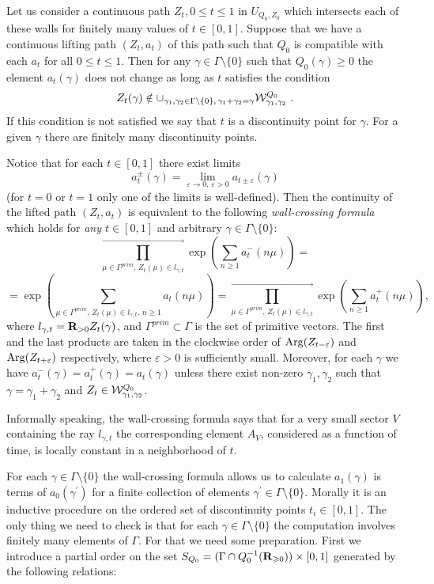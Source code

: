 \documentclass[12pt]{article}
\begin{document}
Let us consider a continuous path $Z_t, 0\le t\le 1$ in $U_{Q_0,Z_0}$ which intersects each of these walls for finitely many values of $t\in [0,1]$. Suppose that we have a continuous lifting path $(Z_t,a_t)$ of this path such that $Q_0$ is compatible with each $a_t$ for all $0\le t\le 1$. Then for any
$\gamma\in \Gamma\setminus \{0\}$ such that $Q_0(\gamma)\geqslant 0$ the element $a_t(\gamma)$ does not change as long as $t$ satisfies the condition $$Z_t(\gamma)\notin \cup_{\gamma_1,\gamma_2\in \Gamma\setminus \{0\},\, \gamma_1+\gamma_2=\gamma}{\cal W}_{\gamma_1,\gamma_2}^{Q_0}\,\,.$$ If this condition is not satisfied we say that $t$ is a discontinuity point for $\gamma$.
For a given $\gamma$ there are finitely many discontinuity points.

Notice that for each $t\in [0,1]$ there exist limits 
$$a^{\pm}_t(\gamma)=\lim_{\varepsilon\to 0, \,\varepsilon>0}a_{t\pm \varepsilon}(\gamma)$$ (for $t=0$ or $t=1$ only one of the limits is well-defined).
Then the continuity of the lifted path $(Z_t,a_t)$ is equivalent to the following {\it wall-crossing formula}
which holds for {\it any $t\in [0,1]$} and arbitrary $\gamma\in \Gamma\setminus\{0\}$:
$$\prod_{\mu\in \Gamma^{prim},\,Z_t(\mu)\in l_{{\gamma},t}}^{\longrightarrow}\exp\left(\sum_{n\geqslant 1}a_t^{-}(n\mu)\right)=$$
$${}=\exp\left(\sum_{\mu\in \Gamma^{prim},\,Z_t(\mu)\in l_{{\gamma},t}, \,n\geqslant 1}a_t(n\mu)\right)=\prod_{\mu\in \Gamma^{prim},\,Z_t(\mu)\in l_{{\gamma},t}}^{\longrightarrow}\exp\left(\sum_{n\geqslant 1}a^{+}_t(n\mu)\right),$$
where $l_{\gamma,t}={\bf R}_{>0}Z_t(\gamma)$, and $\Gamma^{prim}\subset \Gamma$ is the set of primitive vectors.
The first and the last products are taken in the clockwise order of $\operatorname{Arg}(Z_{t-\varepsilon})$ and
$\operatorname{Arg}(Z_{t+\varepsilon})$ respectively, where $\varepsilon>0$ is sufficiently small.
Moreover, for each $\gamma$ we have $a_t^{-}(\gamma)=a_t^{+}(\gamma)=a_t(\gamma)$ unless there exist non-zero $\gamma_1,\gamma_2$ such that $\gamma=\gamma_1+\gamma_2$ and $Z_t\in {\cal W}_{\gamma_1,\gamma_2}^{Q_0}$.

\begin{rmk} Informally speaking, the wall-crossing formula says that for a very small sector $V$ containing the ray $l_{{\gamma},t}$ the corresponding element $A_V$, considered as a function of time, is locally constant in a neighborhood of $t$.

\end{rmk}

For each $\gamma\in \Gamma\setminus \{0\}$ the wall-crossing formula allows us to calculate $a_{1}(\gamma)$ is terms of $a_{0}(\gamma^{\prime})$ for a finite collection of elements $\gamma^{\prime}\in \Gamma\setminus \{0\}$. Morally it is an inductive procedure on the ordered set of discontinuity points $t_i\in [0,1]$. The only thing we need to check is that for each $\gamma\in \Gamma\setminus \{0\}$ the computation involves finitely many elements of $\Gamma$. For that we need some preparation. First we introduce a partial order on the set $S_{Q_0}=(\Gamma\cap Q^{-1}_0({\bf R}_{\geqslant 0}))\times [0,1]$ generated by the following relations:
\end{document}
